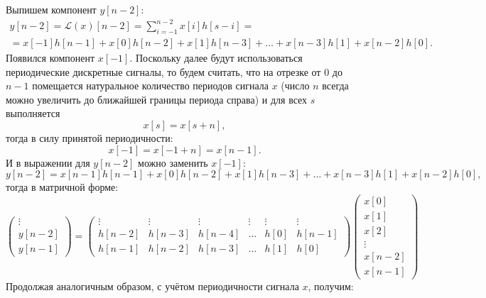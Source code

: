 Выпишем компонент $y[n-2]$:
\begin{multline*}
    y[n-2]
    = \mathcal{L}(x)[n-2]
    = \sum_{i=-1}^{n-2} x[i] h[s-i] = \\
    = x[-1] h[n-1] + x[0] h[n-2] + x[1] h[n-3] + \dots + x[n-3] h[1] + x[n-2] h[0] .
\end{multline*}
Появился компонент $x[-1]$. Поскольку далее будут использоваться периодические дискретные сигналы, то будем считать, что на отрезке от 0 до $n-1$ помещается натуральное количество
периодов сигнала $x$ (число $n$ всегда можно увеличить до ближайшей границы периода справа) и для всех $s$ выполняется
\[
    x[s] = x[s+n] ,
\]
тогда в силу принятой периодичности:
\[
    x[-1] = x[-1+n] = x[n-1].
\]
И в выражении для $y[n-2]$ можно заменить $x[-1]$:
\[
    y[n-2]
    = x[n-1] h[n-1] + x[0] h[n-2] + x[1] h[n-3] + \dots + x[n-3] h[1] + x[n-2] h[0] ,
\]
тогда в матричной форме:
\[
    \begin{pmatrix}
        \vdots \\
        y[n-2] \\
        y[n-1]
    \end{pmatrix}
    = \begin{pmatrix}
        \vdots & \vdots & \vdots & \vdots & \vdots & \vdots \\
        h[n-2] & h[n-3] & h[n-4] & \dots  & h[0]   & h[n-1] \\
        h[n-1] & h[n-2] & h[n-3] & \dots  & h[1]   & h[0]
    \end{pmatrix}
    \begin{pmatrix}
        x[0]   \\
        x[1]   \\
        x[2]   \\
        \vdots \\
        x[n-2] \\
        x[n-1]
    \end{pmatrix}
\]
Продолжая аналогичным образом, с учётом периодичности сигнала $x$, получим:
